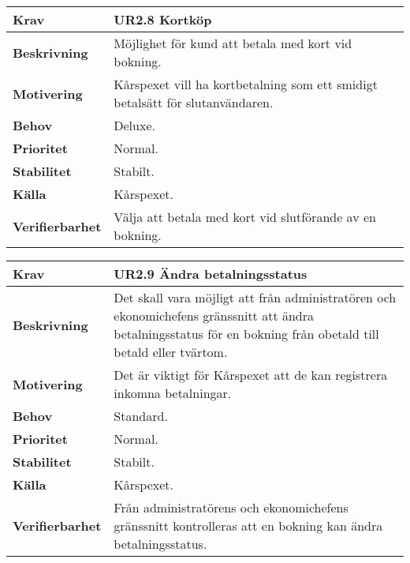 \documentclass[a4paper, twoside, 11pt, titlepage]{article}
\begin{document}
		\begin{tabular} { p{2.6cm} p{12.5cm} }
			\hline
			\sffamily\textbf{Krav} & \sffamily\textbf{UR2.8 Kortköp  } \\
			\hline
			\sffamily\textbf{Beskrivning} & Möjlighet för kund att betala med kort vid bokning.  \\
			\hline
			\sffamily\textbf{Motivering} & Kårspexet vill ha kortbetalning som ett smidigt betalsätt för slutanvändaren.  \\
			\hline
			\sffamily\textbf{Behov} & Deluxe.  \\
			\hline
			\sffamily\textbf{Prioritet} & Normal.  \\
			\hline
			\sffamily\textbf{Stabilitet} & Stabilt.  \\
			\hline
			\sffamily\textbf{Källa} & Kårspexet.  \\
			\hline
			\sffamily\textbf{Verifierbarhet} & Välja att betala med kort vid slutförande av en bokning.  \\
			\hline
		\end{tabular}
		\vspace{6mm}

		\begin{tabular} { p{2.6cm} p{12.5cm} }
			\hline
			\sffamily\textbf{Krav} & \sffamily\textbf{UR2.9 Ändra betalningsstatus  } \\
			\hline
			\sffamily\textbf{Beskrivning} & Det skall vara möjligt att från administratören och ekonomichefens gränssnitt att ändra betalningsstatus för en bokning från obetald till betald eller tvärtom.  \\
			\hline
			\sffamily\textbf{Motivering} & Det är viktigt för Kårspexet att de kan registrera inkomna betalningar.  \\
			\hline
			\sffamily\textbf{Behov} & Standard.  \\
			\hline
			\sffamily\textbf{Prioritet} & Normal.  \\
			\hline
			\sffamily\textbf{Stabilitet} & Stabilt.  \\
			\hline
			\sffamily\textbf{Källa} & Kårspexet.  \\
			\hline
			\sffamily\textbf{Verifierbarhet} & Från administratörens och ekonomichefens gränssnitt kontrolleras att en bokning kan ändra betalningsstatus.  \\
			\hline
		\end{tabular}
		\vspace{6mm}
\end{document}
